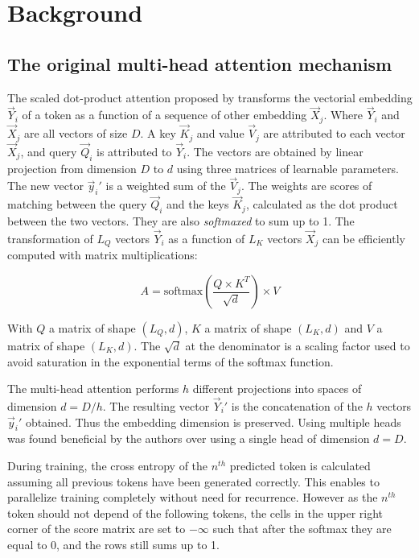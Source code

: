 \section{Background}

\subsection{The original multi-head attention
mechanism}

The scaled dot-product attention proposed by
\citet{vaswani2017attention} transforms the vectorial embedding $\vec{Y}_i$ of a token as a
 function of a sequence of other embedding $\vec{X}_j$. Where
 $\vec{Y}_i$ and $\vec{X}_j$ are all vectors of size $D$. A key
$\vec{K}_j$ and value $\vec{V}_j$ are attributed to each vector
$\vec{X}_j$, and query $\vec{Q}_i$ is attributed to $\vec{Y}_i$.
 The vectors are obtained by linear projection from dimension $D$ to $d$ using three matrices of learnable parameters. The new vector
 $\vec{y}_i'$ is a weighted sum of the $\vec{V}_j$. The weights are
 scores of matching between the query $\vec{Q}_i$ and the keys
$\vec{K}_j$, calculated as the dot product between the two vectors.
They are also \emph{softmaxed} to sum up to 1. The transformation of $L_Q$
vectors $\vec{Y}_i$ as a function of $L_K$ vectors $\vec{X}_j$ can be efficiently computed with matrix multiplications:

\begin{equation}
A = \mathrm{softmax}\left(\frac{Q \times K^T}{\sqrt{d}}\right) \times V
\end{equation}

With $Q$ a matrix of shape $(L_Q, d)$, $K$ a matrix of shape
 $(L_K, d)$ and $V$ a matrix of shape $(L_K, d)$. The $\sqrt{d}$
at the denominator is a scaling factor used to avoid saturation in the
exponential terms of the softmax function.

The multi-head attention performs $h$ different projections into spaces
 of dimension $d = D/h$. The resulting vector $\vec{Y}_i'$ is the
concatenation of the $h$ vectors $\vec{y}_i'$ obtained. Thus the
embedding dimension is preserved. Using multiple heads was found
beneficial by the authors over using a single head of dimension
$d = D$.

During training, the cross entropy of the $n^{th}$ predicted token is
 calculated assuming all previous tokens have been generated correctly.
 This enables to parallelize training completely without need for
recurrence. However as the $n^{th}$ token should not depend of the
following tokens, the cells in the upper right corner of the score
matrix are set to $-\infty$ such that after the softmax they are equal
to 0, and the rows still sums up to 1.

